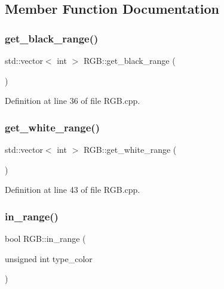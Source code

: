 \subsection{Member Function Documentation}
\mbox{\label{class_r_g_b_aa745e7dff1d7b49c78fa12da0c6e0835}} 
\subsubsection{\texorpdfstring{get\+\_\+black\+\_\+range()}{get\_black\_range()}}
{\footnotesize\ttfamily std\+::vector$<$ int $>$ R\+G\+B\+::get\+\_\+black\+\_\+range (\begin{DoxyParamCaption}{ }\end{DoxyParamCaption})}



Definition at line 36 of file R\+G\+B.\+cpp.

\mbox{\label{class_r_g_b_a96764f94cfd38f38b0e975c3c77ffaa5}} 
\subsubsection{\texorpdfstring{get\+\_\+white\+\_\+range()}{get\_white\_range()}}
{\footnotesize\ttfamily std\+::vector$<$ int $>$ R\+G\+B\+::get\+\_\+white\+\_\+range (\begin{DoxyParamCaption}{ }\end{DoxyParamCaption})}



Definition at line 43 of file R\+G\+B.\+cpp.

\mbox{\label{class_r_g_b_a61239b0df41eba4c53a2a7c6feaff698}} 
\subsubsection{\texorpdfstring{in\+\_\+range()}{in\_range()}}
{\footnotesize\ttfamily bool R\+G\+B\+::in\+\_\+range (\begin{DoxyParamCaption}\item[{unsigned int}]{type\+\_\+color }\end{DoxyParamCaption})}



